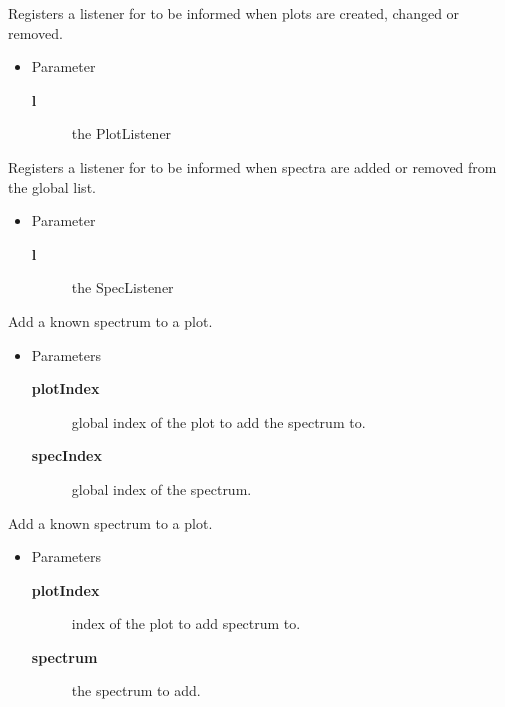 \begin{desc}Registers a listener for to be informed when plots are
  created, changed or removed.
\begin{itemize}
\item{Parameter
  \begin{description}
   \item[\textbf{l}]{the PlotListener}
  \end{description}}
\end{itemize}
\end{desc}

\begin{desc}Registers a listener for to be informed when spectra are added
  or removed from the global list.
\begin{itemize}
\item{Parameter
  \begin{description}
   \item[\textbf{l}]{the SpecListener}
  \end{description}}
\end{itemize}
\end{desc}

\begin{desc}Add a known spectrum to a plot.
\begin{itemize}
\item{Parameters
  \begin{description}
   \item[\textbf{plotIndex}]{global index of the plot to add the spectrum to.}
   \item[\textbf{specIndex}]{global index of the spectrum.}
  \end{description}}
\end{itemize}
\end{desc}

\begin{desc}Add a known spectrum to a plot.
\begin{itemize}
\item{Parameters
  \begin{description}
   \item[\textbf{plotIndex}]{index of the plot to add spectrum to.}
   \item[\textbf{spectrum}]{the spectrum to add.}
  \end{description}}
\end{itemize}
\end{desc}

